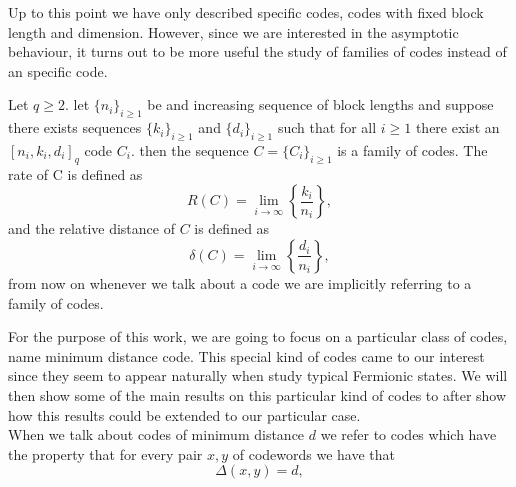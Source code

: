 Up to this point we have only described specific codes, codes with fixed block length and dimension. However, since we are interested in the asymptotic behaviour, it turns out to be more useful the study of families of codes instead of an specific code.

\begin{definition}
 Let $q\geq 2$. let $\{n_i\}_{i\geq 1}$ be and increasing sequence of block lengths and suppose there exists sequences $\{k_i\}_{i\geq 1}$ and $\{d_i\}_{i\geq 1}$ such that for all $i\geq 1$ there exist an $[n_i,k_i,d_i]_q$ code $C_i$. then the sequence $C=\{C_i\}_{i\geq1}$ is a family of codes. The rate of C is defined as
\begin{equation}
R(C)=\lim _{i \rightarrow \infty}\left\{\frac{k_{i}}{n_{i}}\right\},
\label{CH2:Rate_of_family_code}
\end{equation}
and the relative distance of $C$ is defined as
\begin{equation}
\delta(C)=\lim _{i \rightarrow \infty}\left\{\frac{d_{i}}{n_{i}}\right\},
\label{CH2:Relative_distance_of_family_code}
\end{equation}
from now on whenever we talk about a code we are implicitly referring to a family of codes.\\
\end{definition}
For the purpose of this work, we are going to focus on a particular class of codes, name minimum distance code. This special kind of codes came to our interest since they seem to appear naturally when study typical Fermionic states. We will then show some of the main results on this particular kind of codes to after show how this results could be extended to our particular case.\\
When we talk about codes of minimum distance $d$ we refer to codes which have the property that for every pair $x,y$ of codewords we have that
\begin{equation}
\Delta(x,y) =d,
\end{equation}


